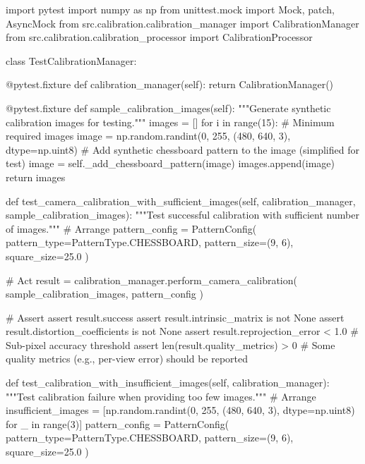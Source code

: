 \documentclass[11pt,a4paper]{report}
\begin{document}
    import pytest
    import numpy as np
    from unittest.mock import Mock, patch, AsyncMock
    from src.calibration.calibration\_manager import CalibrationManager
    from src.calibration.calibration\_processor import CalibrationProcessor

    class TestCalibrationManager:

        @pytest.fixture
        def calibration\_manager(self):
            return CalibrationManager()

        @pytest.fixture
        def sample\_calibration\_images(self):
            """Generate synthetic calibration images for testing."""
            images = []
            for i in range(15):  # Minimum required images
                image = np.random.randint(0, 255, (480, 640, 3), dtype=np.uint8)
                # Add synthetic chessboard pattern to the image (simplified for test)
                image = self.\_add\_chessboard\_pattern(image)
                images.append(image)
            return images

        def test\_camera\_calibration\_with\_sufficient\_images(self, calibration\_manager, sample\_calibration\_images):
            """Test successful calibration with sufficient number of images."""
            # Arrange
            pattern\_config = PatternConfig(
                pattern\_type=PatternType.CHESSBOARD,
                pattern\_size=(9, 6),
                square\_size=25.0
            )

            # Act
            result = calibration\_manager.perform\_camera\_calibration(
                sample\_calibration\_images, 
                pattern\_config
            )

            # Assert
            assert result.success
            assert result.intrinsic\_matrix is not None
            assert result.distortion\_coefficients is not None
            assert result.reprojection\_error < 1.0  # Sub-pixel accuracy threshold
            assert len(result.quality\_metrics) > 0   # Some quality metrics (e.g., per-view error) should be reported

        def test\_calibration\_with\_insufficient\_images(self, calibration\_manager):
            """Test calibration failure when providing too few images."""
            # Arrange
            insufficient\_images = [np.random.randint(0, 255, (480, 640, 3), dtype=np.uint8) for _ in range(3)]
            pattern\_config = PatternConfig(
                pattern\_type=PatternType.CHESSBOARD,
                pattern\_size=(9, 6),
                square\_size=25.0
            )
\end{document}
